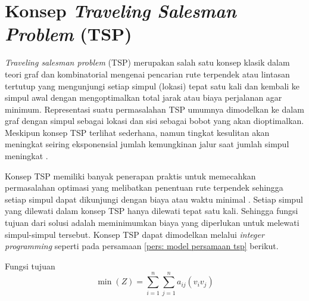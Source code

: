 \section{Konsep \textit{Traveling Salesman Problem} (TSP)}
\vspace{-4mm}
{\frenchspacing
    \textit{Traveling salesman problem} (TSP) merupakan salah satu konsep klasik dalam teori graf
    dan kombinatorial mengenai pencarian rute terpendek atau lintasan tertutup yang mengunjungi
    setiap simpul (lokasi) tepat satu kali dan kembali ke simpul awal dengan mengoptimalkan total jarak atau
    biaya perjalanan agar minimum. Representasi suatu permasalahan TSP umumnya dimodelkan ke dalam graf
    dengan simpul sebagai lokasi dan sisi sebagai bobot yang akan dioptimalkan.
    Meskipun konsep TSP terlihat sederhana, namun tingkat kesulitan akan meningkat seiring
    eksponensial jumlah kemungkinan jalur saat jumlah simpul meningkat .


    Konsep TSP memiliki banyak penerapan praktis untuk memecahkan permasalahan optimasi yang melibatkan
    penentuan rute terpendek sehingga setiap simpul dapat dikunjungi dengan biaya atau waktu minimal .
    Setiap simpul yang dilewati dalam konsep TSP hanya dilewati tepat satu kali.
    Sehingga fungsi tujuan dari solusi adalah meminimumkan biaya yang diperlukan untuk melewati simpul-simpul tersebut.
    Konsep TSP dapat dimodelkan melalui \textit{integer programming} seperti pada persamaan \ref{pers: model persamaan tsp} berikut.

    \noindent
    Fungsi tujuan
    \begin{equation}
        \label{pers: model persamaan tsp}
        \operatorname{min} (Z) = \sum^{n}_{i=1} \sum^{n}_{j=1} a_{ij}(v_{i}v_{j})
    \end{equation}

}
